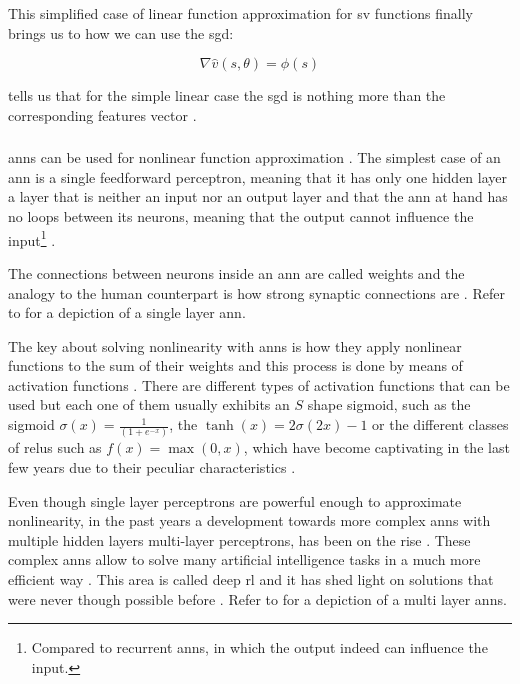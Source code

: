 This simplified case of linear function approximation for \gls{sv} functions finally brings us to how we can use the \gls{sgd}:

\begin{equation}
\label{eq:sgd_linear}
	\nabla \hat{v} (s,\theta) = \phi (s)
\end{equation}

 tells us that for the simple linear case the \gls{sgd} is nothing more than the corresponding features vector \citep[p. 199]{Sutton2017}.

\subsubsection{}
\label{subsubsec:ann_theory}

\glspl{ann} can be used for nonlinear function approximation \citep[p. 199]{Sutton2017}. The simplest case of an \gls{ann} is a single feedforward perceptron, meaning that it has only one hidden layer \ie a layer that is neither an input nor an output layer and that the \gls{ann} at hand has no loops between its neurons, meaning that the output cannot influence the input\footnote{Compared to recurrent \glspl{ann}, in which the output indeed can influence the input.} \citep[p. 216]{Sutton2017}. 

The connections between neurons inside an \gls{ann} are called weights and the analogy to the human counterpart is how strong synaptic connections are \citep[p. 216]{Sutton2017}. Refer to  for a depiction of a single layer \gls{ann}.

The key about solving nonlinearity with \glspl{ann} is how they apply nonlinear functions to the sum of their weights and this process is done by means of activation functions \citep[p. 216]{Sutton2017}. There are different types of activation functions that can be used but each one of them usually exhibits an $S$ shape \ie sigmoid, such as the sigmoid $\sigma(x) = \frac{1}{(1+e^{-x})}$, the $\tanh(x) = 2\sigma(2x)-1$ or the different classes of \glspl{relu} such as $f(x) = \max(0,x)$, which have become captivating in the last few years due to their peculiar characteristics \citep[p. 216]{Sutton2017}.

Even though single layer perceptrons are powerful enough to approximate nonlinearity, in the past years a development towards more complex \glspl{ann} with multiple hidden layers \ie multi-layer perceptrons, has been on the rise \citep[p. 217]{Sutton2017}. These complex \glspl{ann} allow to solve many artificial intelligence tasks in a much more efficient way \citep{Bengio2009}. This area is called deep \gls{rl} and it has shed light on solutions that were never though possible before \citep{Bengio2009}. Refer to  for a depiction of a multi layer \glspl{ann}.

